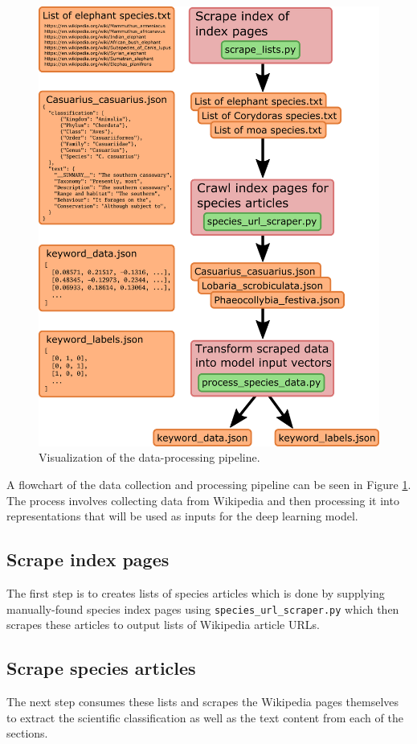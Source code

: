 \documentclass[10pt,twocolumn,letterpaper]{article}
\begin{document}
\begin{figure}
  \includegraphics[width=\linewidth]{data.png}
  \caption{Visualization of the data-processing pipeline.}
  \label{fig:data}
\end{figure}

A flowchart of the data collection and processing pipeline can be seen in Figure \ref{fig:data}. The process involves collecting data from Wikipedia and then processing it into representations that will be used as inputs for the deep learning model.

\subsection{Scrape index pages}
The first step is to creates lists of species articles which is done by supplying manually-found species index pages using \texttt{species\_url\_scraper.py} which then scrapes these articles to output lists of Wikipedia article URLs.

\subsection{Scrape species articles} The next step consumes these lists and scrapes the Wikipedia pages themselves to extract the scientific classification as well as the text content from each of the sections.
\end{document}
